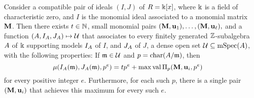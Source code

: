 \documentclass{amsart}
\begin{document}
\begin{theorem}
   \label{invariants associated to a monomial ideal in large characteristic: T}   
   Consider a compatible pair of ideals $(I,J)$ of $R=\Bbbk[x]$, where $\Bbbk$ is a field of characteristic zero, and $I$ is the monomial ideal associated to a monomial matrix $\mathbf{M}$.  Then there exists $t \in \mathbb{N}$, small monomial pairs $(\mathbf{M}, \mathbf{u}_1),  \ldots, (\mathbf{M}, \mathbf{u}_{\ell}),$ and a function $(A, I_A, J_A) \mapsto \mathcal{U}$  that associates to every finitely generated $\mathbb{Z}$-subalgebra $A$ of $\Bbbk$ supporting models $I_A$ of $I$, and $J_A$ of $J$, a dense open set $\mathcal{U} \subseteq \operatorname{mSpec}(A)$, with the following properties\textup:
   If $\mathfrak{m} \in \mathcal{U}$ and $p = \operatorname{char}(A/\mathfrak{m})$, then 
   \[
      \mu(I_A(\mathfrak{m}), J_A(\mathfrak{m}), p^e) = tp^e + \max \operatorname{val} \Pi_p(\mathbf{M}, \mathbf{u}_i, p^e) 
   \]
   for every positive integer $e$.
Furthermore, for each such $p$, there is a single pair $(\mathbf{M}, \mathbf{u}_i)$ that achieves this maximum for every such $e$.  
\end{theorem}
\end{document}
